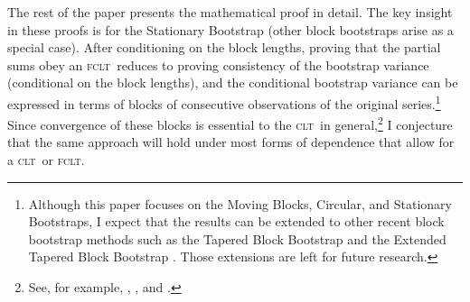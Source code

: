 \documentclass[11pt]{article}
\theoremstyle{definition}
\newcommand{\clt}{\textsc{clt}}
\newcommand{\fclt}{\textsc{fclt}}
\begin{document}
The rest of the paper presents the mathematical proof in detail.
The key insight in these proofs is for the Stationary Bootstrap (other
block bootstraps arise as a special case).  After conditioning on the
block lengths, proving that the partial sums obey an \fclt\ reduces to
proving consistency of the bootstrap variance (conditional on the
block lengths), and the conditional bootstrap variance can be
expressed in terms of blocks of consecutive observations of the
original series.\footnote{Although this paper focuses on the Moving Blocks,
Circular, and Stationary Bootstraps, I expect that the results can be
extended to other recent block bootstrap methods such as the Tapered Block
Bootstrap \citep{PaP:01,PaP:02b} and the Extended Tapered Block Bootstrap
\citep{Sha:10}.  Those extensions are left for future research.}
Since convergence of these blocks is essential to
the \clt\ in general,\footnote{See, for example, \citet{Mcl:74},
  \citet[Chapter 3]{HaH:80}, and \citet[Chapter 24]{Dav:94}.} I
conjecture that the same approach will hold under most forms of
dependence that allow for a \clt\ or \fclt.

\appendix
\end{document}
